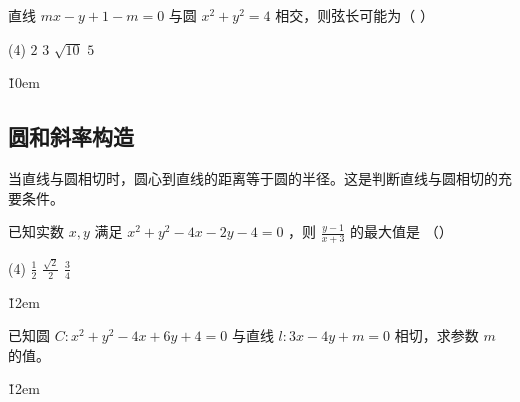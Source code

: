 \begin{example}
    直线 $m x-y+1-m=0$ 与圆 $x^2+y^2=4$ 相交，则弦长可能为（ \hspace{2em} ）
    \begin{tasks}(4)
        \task $2$
        \task $3$
        \task $\sqrt{10}$
        \task $5$
    \end{tasks}
\end{example}

\v{10em}

\subsection{圆和斜率构造}

\begin{theorem}[求直线与圆相切]
    当直线与圆相切时，圆心到直线的距离等于圆的半径。这是判断直线与圆相切的充要条件。
    \begin{center}
    \end{center}
\end{theorem}

\begin{example}
    已知实数 $x, y$ 满足 $x^2+y^2-4 x-2 y-4=0$ ，则 $\frac{y-1}{x+3}$ 的最大值是 （\qquad）
    \begin{tasks}(4)
        \task $\frac{1}{2}$
        \task $\frac{\sqrt{2}}{2}$
        \task $\frac{3}{4}$
    \end{tasks}
\end{example}

\v{12em}

\begin{example}
    已知圆 $C: x^2+y^2-4x+6y+4=0$ 与直线 $l: 3x-4y+m=0$ 相切，求参数 $m$ 的值。
\end{example}

\v{12em}

